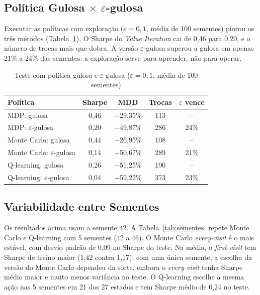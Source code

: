 \documentclass[conference]{IEEEtran}
\begin{document}
\subsection{Política Gulosa $\times$ $\varepsilon$-gulosa}

Executar as políticas com exploração ($\varepsilon = 0{,}1$, média de 100 sementes) piorou os três métodos (Tabela~\ref{tab:epsilon}). O Sharpe do \textit{Value Iteration} cai de 0,46 para 0,20, e o número de trocas mais que dobra. A versão $\varepsilon$-gulosa superou a gulosa em apenas 21\% a 24\% das sementes: a exploração serve para aprender, não para operar.

\begin{table}[!t]
  \centering
  \caption{Teste com política gulosa e $\varepsilon$-gulosa ($\varepsilon = 0{,}1$, média de 100 sementes)}
  \label{tab:epsilon}
  \footnotesize
  \setlength{\tabcolsep}{4.5pt}
  \renewcommand{\arraystretch}{1.1}
  \begin{tabular}{l cccc}
    \toprule
    \textbf{Política} & \textbf{Sharpe} & \textbf{MDD} & \textbf{Trocas} & \textbf{$\varepsilon$ vence} \\
    \midrule
    MDP: gulosa                         & 0,46 & $-$29,35\% & 113 & --    \\
    MDP: $\varepsilon$-gulosa           & 0,20 & $-$49,87\% & 286 & 24\%  \\
    \midrule
    Monte Carlo: gulosa                 & 0,44 & $-$26,95\% & 108 & --    \\
    Monte Carlo: $\varepsilon$-gulosa   & 0,14 & $-$50,67\% & 289 & 21\%  \\
    \midrule
    Q-learning: gulosa                  & 0,26 & $-$51,25\% & 190 & --    \\
    Q-learning: $\varepsilon$-gulosa    & 0,04 & $-$59,22\% & 373 & 23\%  \\
    \bottomrule
  \end{tabular}
\end{table}

\subsection{Variabilidade entre Sementes}

Os resultados acima usam a semente 42. A Tabela~\ref{tab:sementes} repete Monte Carlo e Q-learning com 5 sementes (42 a 46). O Monte Carlo \textit{every-visit} é o mais estável, com desvio padrão de 0,09 no Sharpe do teste. Na média, o \textit{first-visit} tem Sharpe de treino maior (1,42 contra 1,17): com uma única semente, a escolha da versão do Monte Carlo dependeu da sorte, embora o \textit{every-visit} tenha Sharpe médio maior e muito menos variância no teste. O Q-learning escolhe a mesma ação nas 5 sementes em 21 dos 27 estados e tem Sharpe médio de 0,24 no teste.
\end{document}
